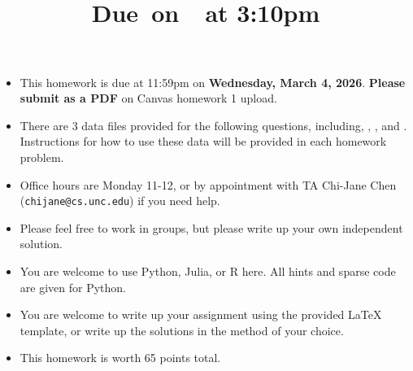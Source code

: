 \documentclass{article}
\title{
    \vspace{2in}
    \textmd{\textbf{\hmwkClass\hmwkTitle}}\\
    \normalsize\vspace{0.1in}\small{Due\ on\ \hmwkDueDate\ at 3:10pm}\\
    \vspace{3in}
}
\author{\hmwkAuthorName}
\date{}
\begin{document}

\begin{itemize}
\item This homework is due at 11:59pm on {\bf Wednesday, March 4, 2026}. {\bf Please submit as a PDF} on Canvas homework 1 upload. 
\item There are 3 data files provided for the following questions, including, , , and . Instructions for how to use these data will be provided in each homework problem. 
\item Office hours are Monday 11-12, or by appointment with TA Chi-Jane Chen (\texttt{chijane@cs.unc.edu}) if  you need help. 
\item Please feel free to work in groups, but please write up your own independent solution. 
\item You are welcome to use Python, Julia, or R here. All hints and sparse code are given for Python.
\item You are welcome to write up your assignment using the provided LaTeX template, or write up the solutions in the method of your choice. 
\item This homework is worth 65 points total. 
\end{itemize}
\end{document}
